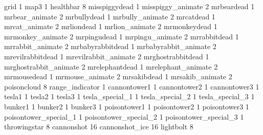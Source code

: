 grid 1
map3 1
healthbar 8
misspiggydead 1
misspiggy_animate 2
mrbeardead 1
mrbear_animate 2
mrbullydead 1
mrbully_animate 2
mrcatdead 1
mrcat_animate 2
mrliondead 1
mrlion_animate 2
mrmonkeydead 1
mrmonkey_animate 2
mrpingudead 1
mrpingu_animate 2
mrrabbitdead 1
mrrabbit_animate 2
mrbabyrabbitdead 1
mrbabyrabbit_animate 2
mrevilrabbitdead 1
mrevilrabbit_animate 2
mrghostrabbitdead 1
mrghostrabbit_animate 2
mrelephantdead 1
mrelephant_animate 2
mrmousedead 1
mrmouse_animate 2
mrsakibdead 1
mrsakib_animate 2
poisoncloud 8
range_indicator 1
cannontower1 1
cannontower2 1
cannontower3 1
tesla1 1
tesla2 1
tesla3 1
tesla_special_1 1
tesla_special_2 1
tesla_special_3 1
bunker1 1
bunker2 1
bunker3 1
poisontower1 1
poisontower2 1
poisontower3 1
poisontower_special_1 1
poisontower_special_2 1
poisontower_special_3 1
throwingstar 8
cannonshot 16
cannonshot_ice 16
lightbolt 8
